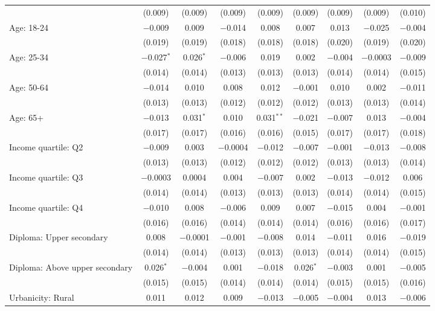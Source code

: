 \begin{tabular}{@{\extracolsep{5pt}}lcccccccc}
  & (0.009) & (0.009) & (0.009) & (0.009) & (0.009) & (0.009) & (0.009) & (0.010) \\ 
  Age: 18\mbox{-}24 & $-$0.009 & 0.009 & $-$0.014 & 0.008 & 0.007 & 0.013 & $-$0.025 & $-$0.004 \\ 
  & (0.019) & (0.019) & (0.018) & (0.018) & (0.018) & (0.020) & (0.019) & (0.020) \\ 
  Age: 25\mbox{-}34 & $-$0.027$^{*}$ & 0.026$^{*}$ & $-$0.006 & 0.019 & 0.002 & $-$0.004 & $-$0.0003 & $-$0.009 \\ 
  & (0.014) & (0.014) & (0.013) & (0.013) & (0.013) & (0.014) & (0.014) & (0.015) \\ 
  Age: 50\mbox{-}64 & $-$0.014 & 0.010 & 0.008 & 0.012 & $-$0.001 & 0.010 & 0.002 & $-$0.011 \\ 
  & (0.013) & (0.013) & (0.012) & (0.012) & (0.012) & (0.013) & (0.013) & (0.014) \\ 
  Age: 65+ & $-$0.013 & 0.031$^{*}$ & 0.010 & 0.031$^{**}$ & $-$0.021 & $-$0.007 & 0.013 & $-$0.004 \\ 
  & (0.017) & (0.017) & (0.016) & (0.016) & (0.015) & (0.017) & (0.017) & (0.018) \\ 
  Income quartile: Q2 & $-$0.009 & 0.003 & $-$0.0004 & $-$0.012 & $-$0.007 & $-$0.001 & $-$0.013 & $-$0.008 \\ 
  & (0.013) & (0.013) & (0.012) & (0.012) & (0.012) & (0.013) & (0.013) & (0.014) \\ 
  Income quartile: Q3 & $-$0.0003 & 0.0004 & 0.004 & $-$0.007 & 0.002 & $-$0.013 & $-$0.012 & 0.006 \\ 
  & (0.014) & (0.014) & (0.013) & (0.013) & (0.013) & (0.014) & (0.014) & (0.015) \\ 
  Income quartile: Q4 & $-$0.010 & 0.008 & $-$0.006 & 0.009 & 0.007 & $-$0.015 & 0.004 & $-$0.001 \\ 
  & (0.016) & (0.016) & (0.014) & (0.014) & (0.014) & (0.016) & (0.016) & (0.017) \\ 
  Diploma: Upper secondary & 0.008 & $-$0.0001 & $-$0.001 & $-$0.008 & 0.014 & $-$0.011 & 0.016 & $-$0.019 \\ 
  & (0.014) & (0.014) & (0.013) & (0.013) & (0.013) & (0.014) & (0.014) & (0.015) \\ 
  Diploma: Above upper secondary & 0.026$^{*}$ & $-$0.004 & 0.001 & $-$0.018 & 0.026$^{*}$ & $-$0.003 & 0.001 & $-$0.005 \\ 
  & (0.015) & (0.015) & (0.014) & (0.014) & (0.014) & (0.015) & (0.015) & (0.016) \\ 
  Urbanicity: Rural & 0.011 & 0.012 & 0.009 & $-$0.013 & $-$0.005 & $-$0.004 & 0.013 & $-$0.006 \\ 

\end{tabular}
